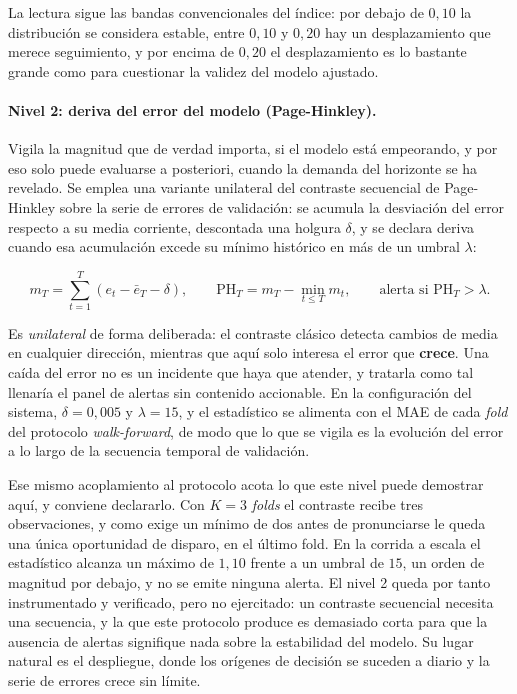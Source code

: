La lectura sigue las bandas convencionales del índice: por debajo de $0{,}10$ la distribución se considera estable, entre $0{,}10$ y $0{,}20$ hay un desplazamiento que merece seguimiento, y por encima de $0{,}20$ el desplazamiento es lo bastante grande como para cuestionar la validez del modelo ajustado.

\paragraph{Nivel 2: deriva del error del modelo (Page-Hinkley).} Vigila la magnitud que de verdad importa, si el modelo está empeorando, y por eso solo puede evaluarse a posteriori, cuando la demanda del horizonte se ha revelado. Se emplea una variante unilateral del contraste secuencial de Page-Hinkley sobre la serie de errores de validación: se acumula la desviación del error respecto a su media corriente, descontada una holgura $\delta$, y se declara deriva cuando esa acumulación excede su mínimo histórico en más de un umbral $\lambda$:

\begin{equation}
    m_T = \sum_{t=1}^{T}\left(e_t - \bar{e}_T - \delta\right),
    \qquad
    \text{PH}_T = m_T - \min_{t \leq T} m_t,
    \qquad
    \text{alerta si } \text{PH}_T > \lambda .
\end{equation}

Es \emph{unilateral} de forma deliberada: el contraste clásico detecta cambios de media en cualquier dirección, mientras que aquí solo interesa el error que \textbf{crece}. Una caída del error no es un incidente que haya que atender, y tratarla como tal llenaría el panel de alertas sin contenido accionable. En la configuración del sistema, $\delta = 0{,}005$ y $\lambda = 15$, y el estadístico se alimenta con el MAE de cada \textit{fold} del protocolo \textit{walk-forward}, de modo que lo que se vigila es la evolución del error a lo largo de la secuencia temporal de validación.

Ese mismo acoplamiento al protocolo acota lo que este nivel puede demostrar aquí, y conviene declararlo. Con $K = 3$ \textit{folds} el contraste recibe tres observaciones, y como exige un mínimo de dos antes de pronunciarse le queda una única oportunidad de disparo, en el último fold. En la corrida a escala el estadístico alcanza un máximo de $1{,}10$ frente a un umbral de $15$, un orden de magnitud por debajo, y no se emite ninguna alerta. El nivel 2 queda por tanto instrumentado y verificado, pero no ejercitado: un contraste secuencial necesita una secuencia, y la que este protocolo produce es demasiado corta para que la ausencia de alertas signifique nada sobre la estabilidad del modelo. Su lugar natural es el despliegue, donde los orígenes de decisión se suceden a diario y la serie de errores crece sin límite.

